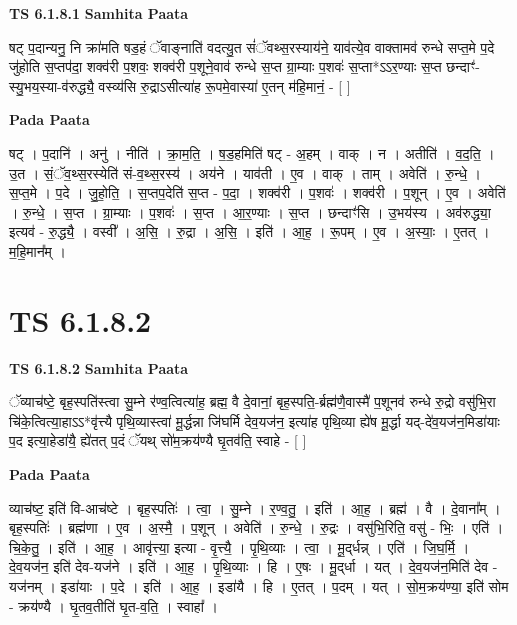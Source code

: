 \documentclass[17pt]{extarticle}
\begin{document}
\textbf{TS 6.1.8.1 } \newline
\textbf{Samhita Paata} \newline

षट् प॒दान्यनु॒ नि क्रा॑मति षड॒हं ॅवाङ्नाति॑ वदत्यु॒त सं॑ॅवथ्स॒रस्याय॑ने॒ याव॑त्ये॒व वाक्तामव॑ रुन्धे सप्त॒मे प॒दे जु॑होति स॒प्तप॑दा॒ शक्व॑री प॒शवः॒ शक्व॑री प॒शूने॒वाव॑ रुन्धे स॒प्त ग्रा॒म्याः प॒शवः॑ स॒प्ता*ऽऽर॒ण्याः स॒प्त छन्दाꣳ॑-स्यु॒भय॒स्या-व॑रुद्ध्यै॒ वस्व्य॑सि रु॒द्राऽसीत्या॑ह रू॒पमे॒वास्या॑ ए॒तन् म॑हि॒मानं॒ - [  ] \newline

\textbf{Pada Paata} \newline

षट् । प॒दानि॑ । अनु॑ । नीति॑ । क्रा॒म॒ति॒ । ष॒ड॒हमिति॑ षट् - अ॒हम् । वाक् । न । अतीति॑ । व॒द॒ति॒ । उ॒त । सं॒ॅव॒थ्स॒रस्येति॑ सं-व॒थ्स॒रस्य॑ । अय॑ने । याव॑ती । ए॒व । वाक् । ताम् । अवेति॑ । रु॒न्धे॒ । स॒प्त॒मे । प॒दे । जु॒हो॒ति॒ । स॒प्तप॒देति॑ स॒प्त - प॒दा॒ । शक्व॑री । प॒शवः॑ । शक्व॑री । प॒शून् । ए॒व । अवेति॑ । रु॒न्धे॒ । स॒प्त । ग्रा॒म्याः । प॒शवः॑ । स॒प्त । आ॒र॒ण्याः । स॒प्त । छन्दाꣳ॑सि । उ॒भय॑स्य । अव॑रुद्ध्या॒ इत्यव॑ - रु॒द्ध्यै॒ । वस्वी᳚ । अ॒सि॒ । रु॒द्रा । अ॒सि॒ । इति॑ । आ॒ह॒ । रू॒पम् । ए॒व । अ॒स्याः॒ । ए॒तत् । म॒हि॒मान᳚म् ।  \newline





\section{ TS 6.1.8.2 }

\textbf{TS 6.1.8.2 } \newline
\textbf{Samhita Paata} \newline

ॅव्याच॑ष्टे॒ बृह॒स्पति॑स्त्वा सु॒म्ने र॑ण्व॒त्वित्या॑ह॒ ब्रह्म॒ वै दे॒वानां॒ बृह॒स्पति॒-र्ब्रह्म॑णै॒वास्मै॑ प॒शूनव॑ रुन्धे रु॒द्रो वसु॑भि॒रा चि॑के॒त्वित्या॒हाऽऽ*वृ॑त्त्यै पृथि॒व्यास्त्वा॑ मू॒र्द्धन्ना जि॑घर्मि देव॒यज॑न॒ इत्या॑ह पृथि॒व्या ह्ये॑ष मू॒र्द्धा यद्-दे॑व॒यज॑न॒मिडा॑याः प॒द इत्या॒हेडा॑यै॒ ह्ये॑तत् प॒दं ॅयथ् सो॑म॒क्रय॑ण्यै घृ॒तव॑ति॒ स्वाहे - [  ] \newline

\textbf{Pada Paata} \newline

व्याच॑ष्ट॒ इति॑ वि-आच॑ष्टे । बृह॒स्पतिः॑ । त्वा॒ । सु॒म्ने । र॒ण्व॒तु॒ । इति॑ । आ॒ह॒ । ब्रह्म॑ । वै । दे॒वाना᳚म् । बृह॒स्पतिः॑ । ब्रह्म॑णा । ए॒व । अ॒स्मै॒ । प॒शून् । अवेति॑ । रु॒न्धे॒ । रु॒द्रः । वसु॑भि॒रिति॒ वसु॑ - भिः॒ । एति॑ । चि॒के॒तु॒ । इति॑ । आ॒ह॒ । आवृ॑त्त्या॒ इत्या - वृ॒त्त्यै॒ । पृ॒थि॒व्याः । त्वा॒ । मू॒द्‌र्धन्न् । एति॑ । जि॒घ॒र्मि॒ । दे॒व॒यज॑न॒ इति॑ देव-यज॑ने । इति॑ । आ॒ह॒ । पृ॒थि॒व्याः । हि । ए॒षः । मू॒द्‌र्धा । यत् । दे॒व॒यज॑न॒मिति॑ देव - यज॑नम् । इडा॑याः । प॒दे । इति॑ । आ॒ह॒ । इडा॑यै । हि । ए॒तत् । प॒दम् । यत् । सो॒म॒क्रय॑ण्या॒ इति॑ सोम - क्रय॑ण्यै । घृ॒तव॒तीति॑ घृ॒त-व॒ति॒ । स्वाहा᳚ ।  \newline
\end{document}
